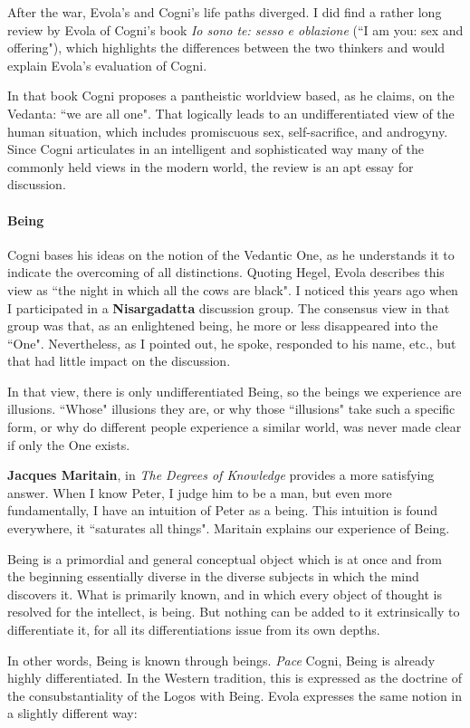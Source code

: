 After the war, Evola's and Cogni's life paths diverged. I did find a rather long review by Evola of Cogni's book \emph{Io sono te: sesso e oblazione} (``I am you: sex and offering"), which highlights the differences between the two thinkers and would explain Evola's evaluation of Cogni.

In that book Cogni proposes a pantheistic worldview based, as he claims, on the Vedanta: ``we are all one". That logically leads to an undifferentiated view of the human situation, which includes promiscuous sex, self-sacrifice, and androgyny. Since Cogni articulates in an intelligent and sophisticated way many of the commonly held views in the modern world, the review is an apt essay for discussion. 

\paragraph{Being}
Cogni bases his ideas on the notion of the Vedantic One, as he understands it to indicate the overcoming of all distinctions. Quoting Hegel, Evola describes this view as ``the night in which all the cows are black". I noticed this years ago when I participated in a \textbf{Nisargadatta} discussion group. The consensus view in that group was that, as an enlightened being, he more or less disappeared into the ``One". Nevertheless, as I pointed out, he spoke, responded to his name, etc., but that had little impact on the discussion.

In that view, there is only undifferentiated Being, so the beings we experience are illusions. ``Whose" illusions they are, or why those ``illusions" take such a specific form, or why do different people experience a similar world, was never made clear if only the One exists.

\textbf{Jacques Maritain}, in \emph{The Degrees of Knowledge} provides a more satisfying answer. When I know Peter, I judge him to be a man, but even more fundamentally, I have an intuition of Peter as a being. This intuition is found everywhere, it ``saturates all things". Maritain explains our experience of Being.

\begin{quotex}
Being is a primordial and general conceptual object which is at once and from the beginning essentially diverse in the diverse subjects in which the mind discovers it. What is primarily known, and in which every object of thought is resolved for the intellect, is being. But nothing can be added to it extrinsically to differentiate it, for all its differentiations issue from its own depths. 

\end{quotex}
In other words, Being is known through beings. \emph{Pace} Cogni, Being is already highly differentiated. In the Western tradition, this is expressed as the doctrine of the consubstantiality of the Logos with Being. Evola expresses the same notion in a slightly different way:

